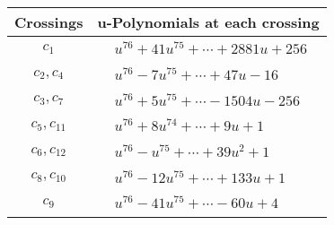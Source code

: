 \documentclass[1p]{elsarticle_modified}
\theoremstyle{definition}
\begin{document}
\begin{tabular}{m{50pt}|m{274pt}}
Crossings & \hspace{64pt}u-Polynomials at each crossing \\
\hline $$\begin{aligned}c_{1}\end{aligned}$$&$\begin{aligned}
&u^{76}+41 u^{75}+\cdots+2881 u+256
\end{aligned}$\\
\hline $$\begin{aligned}c_{2},c_{4}\end{aligned}$$&$\begin{aligned}
&u^{76}-7 u^{75}+\cdots+47 u-16
\end{aligned}$\\
\hline $$\begin{aligned}c_{3},c_{7}\end{aligned}$$&$\begin{aligned}
&u^{76}+5 u^{75}+\cdots-1504 u-256
\end{aligned}$\\
\hline $$\begin{aligned}c_{5},c_{11}\end{aligned}$$&$\begin{aligned}
&u^{76}+8 u^{74}+\cdots+9 u+1
\end{aligned}$\\
\hline $$\begin{aligned}c_{6},c_{12}\end{aligned}$$&$\begin{aligned}
&u^{76}- u^{75}+\cdots+39 u^2+1
\end{aligned}$\\
\hline $$\begin{aligned}c_{8},c_{10}\end{aligned}$$&$\begin{aligned}
&u^{76}-12 u^{75}+\cdots+133 u+1
\end{aligned}$\\
\hline $$\begin{aligned}c_{9}\end{aligned}$$&$\begin{aligned}
&u^{76}-41 u^{75}+\cdots-60 u+4
\end{aligned}$\\
\hline
\end{tabular}\\~\\
\newpage\renewcommand{\arraystretch}{1}
\end{document}
